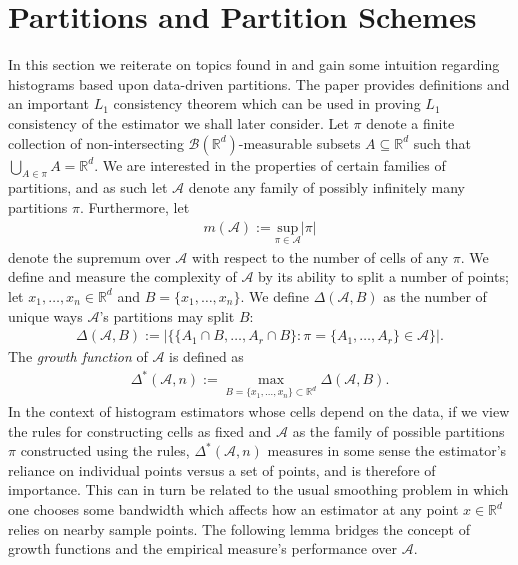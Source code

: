 \documentclass{report}
\begin{document}
\section{Partitions and Partition Schemes}
In this section we reiterate on topics found in \cite{Consistency} and gain some intuition regarding histograms based upon data-driven partitions. 
The paper provides definitions and an important $L_1$ consistency theorem which can be used in proving $L_1$ consistency of the estimator
we shall later consider. 
\newpage
Let $\pi$ denote a finite collection of non-intersecting $\mathcal{B}(\mathbb{R}^d)$-measurable subsets $A \subseteq \mathbb{R}^d$ such that $\bigcup_{A \in \pi} A = \mathbb{R}^d$.
We are interested in the properties of certain families of partitions, and as such let $\mathcal{A}$ denote any family of possibly infinitely many partitions $\pi$. Furthermore, let
\begin{align*}
	m(\mathcal{A}) := \underset{\pi \in \mathcal{A}}{\text{sup}}|\pi|
\end{align*}
denote the supremum over $\mathcal{A}$ with respect to the number of cells of any $\pi$. We define and measure the complexity of $\mathcal{A}$ 
by its ability to split a number of points; let $x_1,\dots,x_n \in \mathbb{R}^d$ and $B = \{x_1,\dots,x_n\}$. We define $\Delta(\mathcal{A},B)$ as the number of unique ways $\mathcal{A}$'s
partitions may split $B$:
\begin{align*}
	\Delta(\mathcal{A},B) := \big| \{ \{A_1 \cap B, \dots, A_r \cap B\} : \pi = \{A_1,\dots,A_r\} \in \mathcal{A} \} \big|.
\end{align*}
The \textit{growth function} of $\mathcal{A}$ is defined as 
\begin{align*}
	\Delta^*(\mathcal{A},n) := \max_{B = \{x_1,\dots,x_n\} \subset \mathbb{R}^d} \Delta(\mathcal{A},B).
\end{align*}
In the context of histogram estimators whose cells depend on the data, if we view the rules for constructing cells as fixed and $\mathcal{A}$ as the family of
possible partitions $\pi$ constructed using the rules, $\Delta^*(\mathcal{A},n)$ measures in some sense the estimator's reliance on individual points versus a set of points,
and is therefore of importance. This can in turn be related to the usual smoothing problem in which one chooses some bandwidth which affects how an estimator at any
point $x \in \mathbb{R}^d$ relies on nearby sample points. The following lemma bridges the concept of growth functions and
the empirical measure's performance over $\mathcal{A}$.\newline
\end{document}
